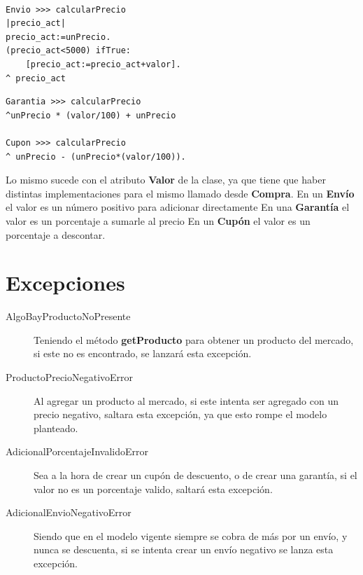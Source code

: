 \documentclass[titlepage,a4paper]{article}
\begin{document}
\vspace{1\baselineskip}
\noindent
\begin{minipage}{0.5\textwidth}
\begin{Verbatim}

Envio >>> calcularPrecio
|precio_act|
precio_act:=unPrecio.
(precio_act<5000) ifTrue:
	[precio_act:=precio_act+valor].
^ precio_act
\end{Verbatim}
\end{minipage}
\hspace{1\baselineskip}
\begin{minipage}{0.5\textwidth}
\begin{Verbatim}
Garantia >>> calcularPrecio
^unPrecio * (valor/100) + unPrecio

Cupon >>> calcularPrecio
^ unPrecio - (unPrecio*(valor/100)). 
\end{Verbatim}
\end{minipage}\hfill
\vspace{1\baselineskip}

Lo mismo sucede con el atributo \textbf{Valor} de la clase, ya que tiene que haber distintas implementaciones para el mismo llamado desde \textbf{Compra}.
\subitem En un \textbf{Envío} el valor es un número positivo para adicionar directamente
\subitem En una \textbf{Garantía} el valor es un porcentaje a sumarle al precio
\subitem En un \textbf{Cupón} el valor es un porcentaje a descontar.

\section{Excepciones}\label{sec:excepciones}

\begin{description}
\item[AlgoBayProductoNoPresente] Teniendo el método \textbf{getProducto} para obtener un producto del mercado, si este no es encontrado, se lanzará esta excepción.
\item[ProductoPrecioNegativoError] Al agregar un producto al mercado, si este intenta ser agregado con un precio negativo, saltara esta excepción, ya que esto rompe el modelo planteado.
\item[AdicionalPorcentajeInvalidoError] Sea a la hora de crear un cupón de descuento, o de crear una garantía, si el valor no es un porcentaje valido, saltará esta excepción.
\item[AdicionalEnvioNegativoError] Siendo que en el modelo vigente siempre se cobra de más por un envío, y nunca se descuenta, si se intenta crear un envío negativo se lanza esta excepción.
\end{description}
\end{document}

